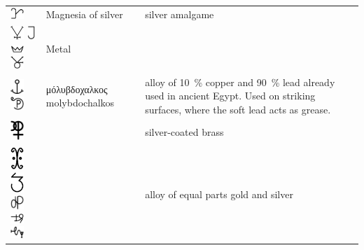 \documentclass[british,final,landscape]{scrartcl}
\begin{document}
\begin{refsection}
\begin{supertabular}{p{0.3\textwidth}p{0.34\textwidth}p{0.34\textwidth}}
   \includegraphics[width=5mm]{Metals/MagnesiaOfSilver} & Magnesia of silver & silver amalgame \\
   \includegraphics[width=5mm]{Metals/Metal} \includegraphics[height=5mm]{Metals/Metal2} \includegraphics[width=5mm]{Metals/Metal3} \includegraphics[width=5mm]{Metals/Metal4} & Metal & \\
   \includegraphics[width=5mm]{Metals/Molybdochalk} \includegraphics[width=5mm]{Metals/Molybdochalk2} & \foreignlanguage{greek}{μόλυβδοχαλκος} molybdochalkos & alloy of \SI{10}{\%} copper and \SI{90}{\%} lead already used in ancient Egypt. Used on striking surfaces, where the soft lead acts as grease.  \\
   \includegraphics[width=5mm]{Metals/OricalchumArgentatum} &  & silver-coated brass \\
   \includegraphics[width=5mm]{Metals/ParsCumParte} \includegraphics[width=5mm]{Metals/ParsCumParte2} \includegraphics[width=5mm]{Metals/ParsCumParte3} \includegraphics[width=5mm]{Metals/ParsCumParte4} \includegraphics[width=5mm]{Metals/ParsCumParte5} &  & alloy of equal parts gold and silver \\

\end{supertabular}
\end{refsection}
\end{document}
